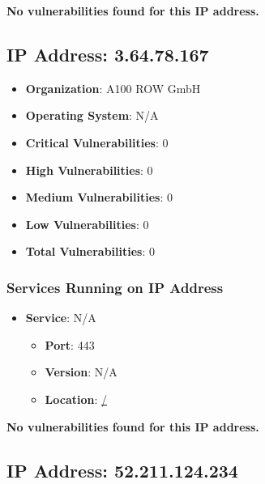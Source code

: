 \documentclass{article}
\begin{document}
\textbf{No vulnerabilities found for this IP address.}




\clearpage



\subsection{IP Address: 3.64.78.167}

\begin{itemize}
    \item \textbf{Organization}: A100 ROW GmbH
    \item \textbf{Operating System}:  N/A 
    \item \textbf{Critical Vulnerabilities}: 0
    \item \textbf{High Vulnerabilities}: 0
    \item \textbf{Medium Vulnerabilities}: 0
    \item \textbf{Low Vulnerabilities}: 0
    \item \textbf{Total Vulnerabilities}: 0
\end{itemize}

\subsubsection*{Services Running on IP Address}

\begin{itemize}
    
        \item \textbf{Service}: N/A
        \begin{itemize}
            \item \textbf{Port}: 443
            \item \textbf{Version}:  N/A 
            \item \textbf{Location}: \href{ / }{ / }
        \end{itemize}
    
\end{itemize}


\textbf{No vulnerabilities found for this IP address.}




\clearpage



\subsection{IP Address: 52.211.124.234}
\end{document}
